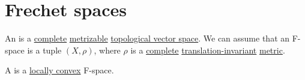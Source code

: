 \section{Frechet spaces}\label{sec:frechet_spaces}

\begin{definition}\label{def:frechet_space}
  An  is a \hyperref[thm:uniform_space_completion]{complete} \hyperref[def:metric_topology]{metrizable} \hyperref[def:topological_vector_space]{topological vector space}. We can assume that an F-space is a tuple \( (X, \rho) \), where \( \rho \) is a \hyperref[def:complete_metric_space]{complete} \hyperref[def:translation_invariant_metric]{translation-invariant} \hyperref[def:metric_space]{metric}.

  A  is a \hyperref[def:locally_convex_space]{locally convex} F-space.
\end{definition}
